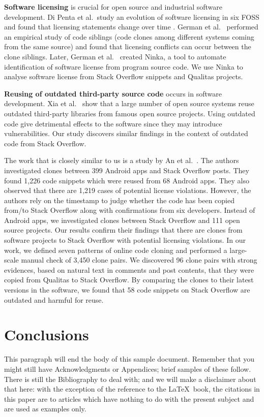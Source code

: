 \documentclass[sigconf,review, anonymous]{acmart}
\begin{document}
\textbf{Software licensing} is crucial for open source and industrial software development. Di Penta et al.~study an evolution of software licensing in six FOSS and found that licensing statements change over time \cite{DiPenta2010}. German et al.~\cite{German2009} performed an empirical study of code siblings (code clones among different systems coming from the same source) and found that licensing conflicts can occur between the clone siblings. Later, German et al.~\cite{German2010} created Ninka, a tool to automate identification of software license from program source code. We use Ninka to analyse software license from Stack Overflow snippets and Qualitas projects. 

\textbf{Reusing of outdated third-party source code} occurs in software development. Xia et al.~\cite{Xia2014} show that a large number of open source systems reuse outdated third-party libraries from famous open source projects. Using outdated code give detrimental effects to the software since they may introduce vulnerabilities. Our study discovers similar findings in the context of outdated code from Stack Overflow.

The work that is closely similar to us is a study by An et al.~\cite{An2017}. The authors investigated clones between 399 Android apps and Stack Overflow posts. They found 1,226 code snippets which were reused from 68 Android apps. They also observed that there are 1,219 cases of potential license violations. However, the authors rely on the timestamp to judge whether the code has been copied from/to Stack Overflow along with confirmations from six developers. Instead of Android apps, we investigated clones between Stack Overflow and 111 open source projects. Our results confirm their findings that there are clones from software projects to Stack Overflow with potential licensing violations. In our work, we defined seven patterns of online code cloning and performed a large-scale manual check of 3,450 clone pairs. We discovered 96 clone pairs with strong evidences, based on natural text in comments and post contents, that they were copied from Qualitas to Stack Overflow. By comparing the clones to their latest versions in the software, we found that 58 code snippets on Stack Overflow are outdated and harmful for reuse.

\section{Conclusions}
This paragraph will end the body of this sample document.
Remember that you might still have Acknowledgments or
Appendices; brief samples of these
follow.  There is still the Bibliography to deal with; and
we will make a disclaimer about that here: with the exception
of the reference to the \LaTeX\ book, the citations in
this paper are to articles which have nothing to
do with the present subject and are used as
examples only.
\end{document}
